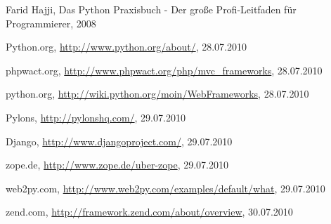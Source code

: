 
\begin{thebibliography}{99}
Farid Hajji, Das Python Praxisbuch - Der große Profi-Leitfaden für
Programmierer, 2008

Python.org, \url{http://www.python.org/about/}, 28.07.2010

phpwact.org, \url{http://www.phpwact.org/php/mvc_frameworks}, 28.07.2010

python.org, \url{http://wiki.python.org/moin/WebFrameworks}, 28.07.2010

Pylons, \url{http://pylonshq.com/}, 29.07.2010

Django, \url{http://www.djangoproject.com/}, 29.07.2010

zope.de, \url{http://www.zope.de/uber-zope}, 29.07.2010

web2py.com, \url{http://www.web2py.com/examples/default/what}, 29.07.2010

zend.com, \url{http://framework.zend.com/about/overview}, 30.07.2010

\end{thebibliography}



%
